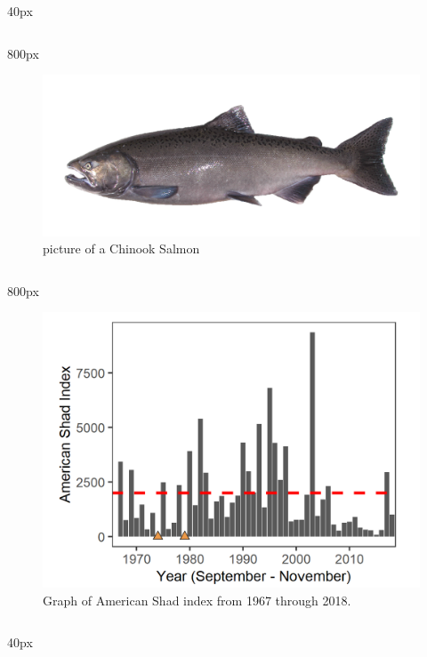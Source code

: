 \documentclass[
]{book}
\begin{document}
\begin{column}{40px\textwidth}
~
\end{column}

\begin{column}{800px\textwidth}
\begin{figure}

{\centering \includegraphics[width=29.17in]{figures/chinook_salmon} 

}

\caption{picture of a Chinook Salmon}\label{fig:unnamed-chunk-129}
\end{figure}
\end{column}

\begin{column}{800px\textwidth}
\begin{figure}
\includegraphics[width=15.25in]{figures/FMWT_AS_1966} \caption{Graph of American Shad index from 1967 through 2018.}\label{fig:unnamed-chunk-130}
\end{figure}
\end{column}

\begin{column}{40px\textwidth}
~
\end{column}
\end{document}
